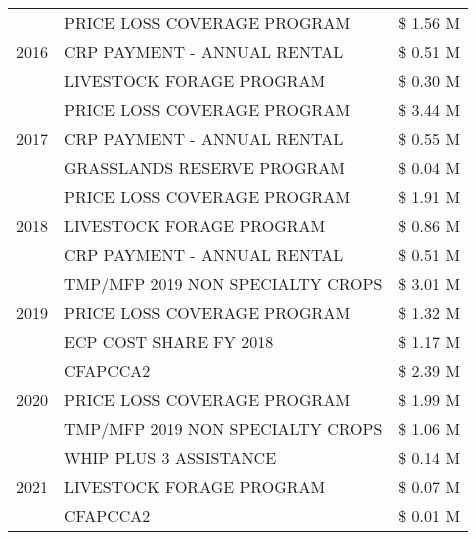 \begin{tabular}{llr}
\cline{1-3}
\multirow[t]{3}{*}{2016} & PRICE LOSS COVERAGE PROGRAM & \$ 1.56 M \\
 & CRP PAYMENT - ANNUAL RENTAL & \$ 0.51 M \\
 & LIVESTOCK FORAGE PROGRAM & \$ 0.30 M \\
\cline{1-3}
\multirow[t]{3}{*}{2017} & PRICE LOSS COVERAGE PROGRAM & \$ 3.44 M \\
 & CRP PAYMENT - ANNUAL RENTAL & \$ 0.55 M \\
 & GRASSLANDS RESERVE PROGRAM & \$ 0.04 M \\
\cline{1-3}
\multirow[t]{3}{*}{2018} & PRICE LOSS COVERAGE PROGRAM & \$ 1.91 M \\
 & LIVESTOCK FORAGE PROGRAM & \$ 0.86 M \\
 & CRP PAYMENT - ANNUAL RENTAL & \$ 0.51 M \\
\cline{1-3}
\multirow[t]{3}{*}{2019} & TMP/MFP 2019 NON SPECIALTY CROPS & \$ 3.01 M \\
 & PRICE LOSS COVERAGE PROGRAM & \$ 1.32 M \\
 & ECP COST SHARE FY 2018 & \$ 1.17 M \\
\cline{1-3}
\multirow[t]{3}{*}{2020} & CFAPCCA2 & \$ 2.39 M \\
 & PRICE LOSS COVERAGE PROGRAM & \$ 1.99 M \\
 & TMP/MFP 2019 NON SPECIALTY CROPS & \$ 1.06 M \\
\cline{1-3}
\multirow[t]{3}{*}{2021} & WHIP PLUS 3 ASSISTANCE & \$ 0.14 M \\
 & LIVESTOCK FORAGE PROGRAM & \$ 0.07 M \\
 & CFAPCCA2 & \$ 0.01 M \\
\cline{1-3}
\bottomrule
\end{tabular}
